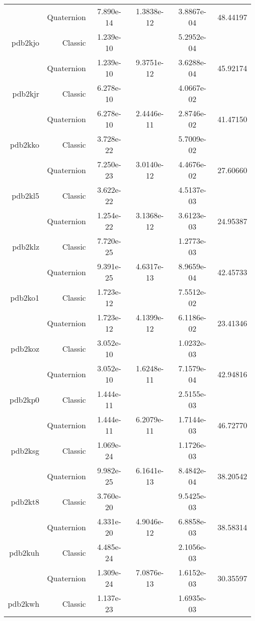 \begin{xltabular}{\textwidth}{r|rS[table-format=1.3e+2]S[table-format=1.4e+2]S[table-format=1.4e+2]S[table-format=-1.5]}
& Quaternion & 7.890e-14 & 1.3838e-12 & 3.8867e-04 & 48.44197\\  \addlinespace
pdb2kjo & Classic & 1.239e-10 &  & 5.2952e-04 & \\
& Quaternion & 1.239e-10 & 9.3751e-12 & 3.6288e-04 & 45.92174\\  \addlinespace
pdb2kjr & Classic & 6.278e-10 &  & 4.0667e-02 & \\
& Quaternion & 6.278e-10 & 2.4446e-11 & 2.8746e-02 & 41.47150\\  \addlinespace
pdb2kko & Classic & 3.728e-22 &  & 5.7009e-02 & \\
& Quaternion & 7.250e-23 & 3.0140e-12 & 4.4676e-02 & 27.60660\\  \addlinespace
pdb2kl5 & Classic & 3.622e-22 &  & 4.5137e-03 & \\
& Quaternion & 1.254e-22 & 3.1368e-12 & 3.6123e-03 & 24.95387\\  \addlinespace
pdb2klz & Classic & 7.720e-25 &  & 1.2773e-03 & \\
& Quaternion & 9.391e-25 & 4.6317e-13 & 8.9659e-04 & 42.45733\\  \addlinespace
pdb2ko1 & Classic & 1.723e-12 &  & 7.5512e-02 & \\
& Quaternion & 1.723e-12 & 4.1399e-12 & 6.1186e-02 & 23.41346\\  \addlinespace
pdb2koz & Classic & 3.052e-10 &  & 1.0232e-03 & \\
& Quaternion & 3.052e-10 & 1.6248e-11 & 7.1579e-04 & 42.94816\\  \addlinespace
pdb2kp0 & Classic & 1.444e-11 &  & 2.5155e-03 & \\
& Quaternion & 1.444e-11 & 6.2079e-11 & 1.7144e-03 & 46.72770\\  \addlinespace
pdb2ksg & Classic & 1.069e-24 &  & 1.1726e-03 & \\
& Quaternion & 9.982e-25 & 6.1641e-13 & 8.4842e-04 & 38.20542\\  \addlinespace
pdb2kt8 & Classic & 3.760e-20 &  & 9.5425e-03 & \\
& Quaternion & 4.331e-20 & 4.9046e-12 & 6.8858e-03 & 38.58314\\  \addlinespace
pdb2kuh & Classic & 4.485e-24 &  & 2.1056e-03 & \\
& Quaternion & 1.309e-24 & 7.0876e-13 & 1.6152e-03 & 30.35597\\  \addlinespace
pdb2kwh & Classic & 1.137e-23 &  & 1.6935e-03 & \\

\end{xltabular}
